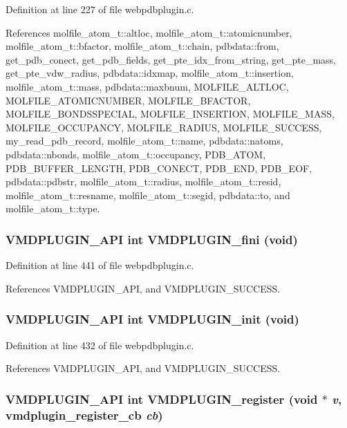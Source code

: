 Definition at line 227 of file webpdbplugin.c.

References molfile\_\-atom\_\-t::altloc, molfile\_\-atom\_\-t::atomicnumber, molfile\_\-atom\_\-t::bfactor, molfile\_\-atom\_\-t::chain, pdbdata::from, get\_\-pdb\_\-conect, get\_\-pdb\_\-fields, get\_\-pte\_\-idx\_\-from\_\-string, get\_\-pte\_\-mass, get\_\-pte\_\-vdw\_\-radius, pdbdata::idxmap, molfile\_\-atom\_\-t::insertion, molfile\_\-atom\_\-t::mass, pdbdata::maxbnum, MOLFILE\_\-ALTLOC, MOLFILE\_\-ATOMICNUMBER, MOLFILE\_\-BFACTOR, MOLFILE\_\-BONDSSPECIAL, MOLFILE\_\-INSERTION, MOLFILE\_\-MASS, MOLFILE\_\-OCCUPANCY, MOLFILE\_\-RADIUS, MOLFILE\_\-SUCCESS, my\_\-read\_\-pdb\_\-record, molfile\_\-atom\_\-t::name, pdbdata::natoms, pdbdata::nbonds, molfile\_\-atom\_\-t::occupancy, PDB\_\-ATOM, PDB\_\-BUFFER\_\-LENGTH, PDB\_\-CONECT, PDB\_\-END, PDB\_\-EOF, pdbdata::pdbstr, molfile\_\-atom\_\-t::radius, molfile\_\-atom\_\-t::resid, molfile\_\-atom\_\-t::resname, molfile\_\-atom\_\-t::segid, pdbdata::to, and molfile\_\-atom\_\-t::type.
\subsubsection{\setlength{\rightskip}{0pt plus 5cm}VMDPLUGIN\_\-API int VMDPLUGIN\_\-fini (void)}\label{webpdbplugin_8c_a13}




Definition at line 441 of file webpdbplugin.c.

References VMDPLUGIN\_\-API, and VMDPLUGIN\_\-SUCCESS.
\subsubsection{\setlength{\rightskip}{0pt plus 5cm}VMDPLUGIN\_\-API int VMDPLUGIN\_\-init (void)}\label{webpdbplugin_8c_a11}




Definition at line 432 of file webpdbplugin.c.

References VMDPLUGIN\_\-API, and VMDPLUGIN\_\-SUCCESS.
\subsubsection{\setlength{\rightskip}{0pt plus 5cm}VMDPLUGIN\_\-API int VMDPLUGIN\_\-register (void $\ast$ {\em v}, {\bf vmdplugin\_\-register\_\-cb} {\em cb})}\label{webpdbplugin_8c_a12}




